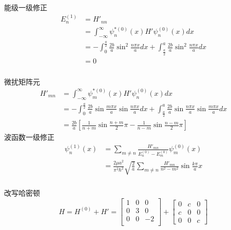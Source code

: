\begin{frame}
  \frametitle{}
能级一级修正 
\[
  \begin{aligned}
    E^{(1)} _n &= H'_{nn} \\ 
    &= \int_{-\infty}^{\infty} \psi ^{*(0)} _n (x)H'\psi ^{(0)} _n (x)dx \\
    &=  -\int_{0}^{\frac{a}{2}} \frac{2b}{a}\sin ^2\frac{n\pi x}{a} dx + \int_{\frac{a}{2}}^{a} \frac{2b}{a}\sin ^2\frac{n\pi x}{a} dx \\
    &= 0
  \end{aligned} 
  \]
\end{frame} 

\begin{frame}
  \frametitle{}
微扰矩阵元
\[
\begin{aligned}
  H'_{mn} &= \int_{-\infty}^{\infty} \psi ^{*(0)} _m (x)H'\psi ^{(0)} _n (x)dx  \\
  &=  -\int_{0}^{\frac{a}{2}} \frac{2b}{a}\sin \frac{m\pi x}{a}\sin \frac{n\pi x}{a} dx + \int_{\frac{a}{2}}^{a} \frac{2b}{a}\sin \frac{n\pi x}{a} \sin \frac{m\pi x}{a} dx \\
  &= \frac{2b}{a}\left[ \frac{1}{n+m}\sin \frac{n+m}{2}\pi - \frac{1}{n-m}\sin \frac{n-m}{2}\pi \right]
\end{aligned} 
\]
波函数一级修正
\[ 
\begin{aligned}
  \psi ^{(1)}_n (x) &= \sum_{m\ne n} \frac{H'_{mn}}{E^{(0)}_n - E^{(0)}_m } \psi ^{(0)}_m (x) \\
  &= \frac{2\mu a^2}{\pi ^2\hbar^2} \sqrt{\frac{2}{a}} \sum_{m\ne n} \frac{H'_{mn} }{n^2 -m^2} \sin \frac{k\pi}{a}x   
\end{aligned}  
\]
\end{frame} 

\begin{frame}
  \frametitle{}
\解 改写哈密顿
$$ H = H^{(0)} + H' = \begin{bmatrix}
  1 & 0 & 0  \\
  0 & 3 & 0  \\
  0 & 0 & -2 \\ 
\end{bmatrix} + \begin{bmatrix}
  0 & c & 0  \\
  c & 0 & 0  \\
  0 & 0 & c  
\end{bmatrix} 
$$
\end{frame} 

